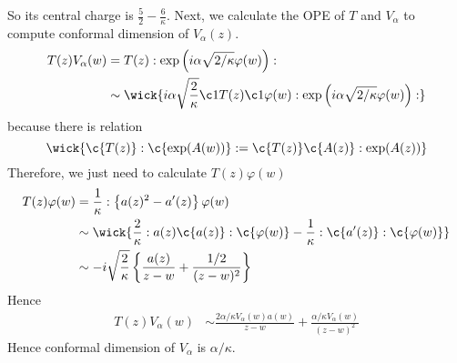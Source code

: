 So its central charge is $\frac{5}{2} - \frac{6}{\kappa}$.
Next, we calculate the OPE of $T$ and $V_\alpha$ to compute conformal dimension of $V_\alpha(z)$.
\begin{equation}
	\begin{split}
	T(z)V_\alpha(w)& = T(z): \exp \left(i\alpha \sqrt{2/\kappa} \varphi(w) \right): \\
	&\sim \wick{i \alpha \sqrt{\frac{2}{\kappa}}\c1{T(z)} \c1{\varphi(w)} : \exp\left(i \alpha \sqrt{2/\kappa}\varphi(w) \right): }
	\end{split}
\end{equation}
because there is relation
\[
\wick{ \c{T(z)} :\c{\exp(A(w))}: = \c{T(z)} \c{A(z)} : \exp(A(z)) }
\]
Therefore, we just need to calculate $T(z)\varphi(w)$
\begin{equation}
	\begin{split}
	T(z)\varphi(w)& = \frac{1}{\kappa}: \left\{a(z)^2 - a'(z) \right\} \varphi(w)\\
	&\sim \wick{\frac{2}{\kappa} : a(z) \c{a(z)} : \c{\varphi(w)} - \frac{1}{\kappa}: \c{a'(z)}: \c{\varphi(w)} } \\
	& \sim - i \sqrt{\frac{2}{\kappa}}\left\{ \frac{a(z)}{z-w} + \frac{1/2}{(z-w)^2}  \right\}
	\end{split}
\end{equation}
Hence
\begin{equation}
	\begin{split}
	T(z)V_\alpha(w) & \sim \frac{2\alpha/\kappa V_\alpha (w)a(w)}{z-w} + \frac{\alpha/\kappa V_\alpha(w)}{(z-w)^2}
	\end{split}
\end{equation}
Hence conformal dimension of $V_\alpha$ is $\alpha/\kappa$.
